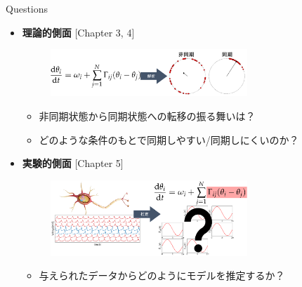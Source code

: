 \begin{frame}{Questions}
\begin{itemize}
  \item \textbf{理論的側面} [Chapter 3, 4]
  \begin{figure}
    \centering
    \includegraphics[width=0.7\textwidth]{figs/theory_ponchi.pdf}
  \end{figure}
  \begin{itemize}
    \item 非同期状態から同期状態への転移の振る舞いは？
    \item どのような条件のもとで同期しやすい/同期しにくいのか？
  \end{itemize}
  \item \textbf{実験的側面} [Chapter 5]
  \begin{figure}
    \includegraphics[width=0.7\textwidth]{figs/gp_coupling_ponchi.pdf}
  \end{figure}
  \begin{itemize}
    \item 与えられたデータからどのようにモデルを推定するか？
  \end{itemize}
\end{itemize}
\end{frame}

